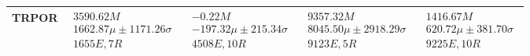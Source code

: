 \begin{tabular}{|l|p{3.2cm}|p{3.2cm}|p{3.2cm}|p{3.2cm}|}
TRPOR & $\begin{array}{c} 3590.62M \\ 1662.87\mu \pm 1171.26\sigma \\ 1655E, 7R \end{array}$ & $\begin{array}{c} -0.22M \\ -197.32\mu \pm 215.34\sigma \\ 4508E, 10R \end{array}$ & $\begin{array}{c} 9357.32M \\ 8045.50\mu \pm 2918.29\sigma \\ 9123E, 5R \end{array}$ & $\begin{array}{c} 1416.67M \\ 620.72\mu \pm 381.70\sigma \\ 9225E, 10R \end{array}$ \\  \hline
\bottomrule  \hline
\end{tabular}
